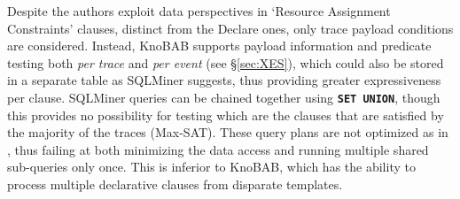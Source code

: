 {Despite the authors} exploit %
{data} perspectives in `Resource Assignment Constraints' clauses, distinct from the Declare ones, %
	only trace payload conditions are considered. Instead, KnoBAB supports payload information and predicate testing {both \emph{per trace}} and \emph{per event} {(see \S\ref{sec:XES})}, which could also be stored in a separate table as SQLMiner suggests, thus providing greater expressiveness per clause.
%
SQLMiner queries can be chained together using \texttt{\textbf{SET UNION}}, though this provides no possibility for testing which are the clauses that are satisfied by the majority of the traces (Max-SAT). These query plans are not optimized as in \cite{BellatrecheKB21}, thus failing at both minimizing the data access
and running multiple shared sub-queries only once.
This is inferior to KnoBAB, which has the ability to process multiple 
declarative clauses from disparate templates. %
